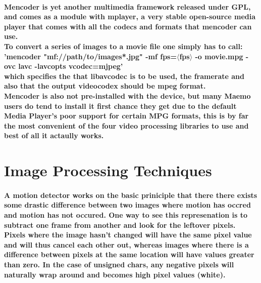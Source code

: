 \paragraph{Mencoder is yet another multimedia framework released under GPL, and comes as a module with mplayer, a very stable open-source media player that comes with all the codecs and formats that mencoder can use.\\
To convert a series of images to a movie file one simply has to call:\\
'mencoder "mf://path/to/images*.jpg" -mf fps=\(\langle\)fps\(\rangle\) -o movie.mpg -ovc lavc -lavcopts vcodec=mjpeg'\\
which specifies the that libavcodec is to be used, the framerate and also that the output videocodex should be mpeg format.
\\Mencoder is also not pre-installed with the device, but many Maemo users do tend to install it first chance they get due to the default Media Player's poor support for certain MPG formats, this is by far the most convenient of the four video processing libraries to use and best of all it actaully works.
}
\section{Image Processing Techniques}
\paragraph{A motion detector works on the basic priniciple that there there exists some drastic difference between two images where motion has occred and motion has not occured. One way to see this represenation is to subtract one frame from another and look for the leftover pixels. Pixels where the image hasn't changed will have the same pixel value and will thus cancel each other out, whereas images where there is a difference between pixels at the same location will have values greater than zero. In the case of unsigned chars, any negative pixels will naturally wrap around and becomes high pixel values (white).}
